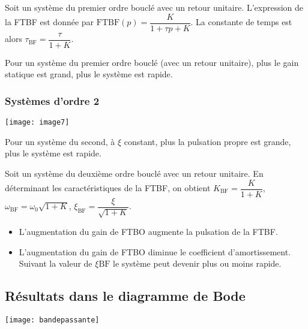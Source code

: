 Soit un système du premier ordre bouclé avec un retour unitaire. L'expression de la FTBF est donnée par $\text{FTBF}(p)=\dfrac{K}{1+\tau p + K}$. La constante de temps est alors $\tau_{\text{BF}}=\dfrac{\tau}{1+K}$. 

\begin{resultat}
Pour un système du premier ordre bouclé (avec un retour unitaire), plus le gain statique est grand, plus le système est rapide. 
\end{resultat}

\subsubsection{Systèmes d'ordre 2}
\begin{marginfigure}
\centering
\texttt{[image: image7]}
\end{marginfigure}

\begin{resultat}
Pour un système du second, à $\xi$ constant, plus la pulsation propre est grande, plus le système est rapide. 
\end{resultat} 


Soit un système du deuxième ordre bouclé avec un retour unitaire. En déterminant les caractéristiques de la FTBF, on obtient $K_{\text{BF}}=\dfrac{K}{1+K}$, $\omega_{\text{BF}}=\omega_0\sqrt{1+K}$, $\xi_{\text{BF}}=\dfrac{\xi}{\sqrt{1+K}}$.



\begin{resultat}
\begin{itemize}
\item L'augmentation du gain de FTBO augmente la pulsation de la FTBF. 
\item L'augmentation du gain de FTBO diminue le coefficient d'amortissement. Suivant la valeur de $\xi{\text{BF}}$ le système peut devenir plus ou moins rapide.  
\end{itemize}
\end{resultat}



\subsection{Résultats dans le diagramme de Bode}


\begin{marginfigure}
\centering
\texttt{[image: bandepassante]}
\end{marginfigure}


